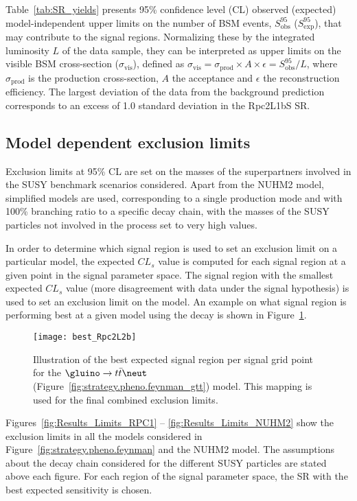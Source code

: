 Table~\ref{tab:SR_yields} presents 95\% confidence level (CL) observed (expected) model-independent upper limits 
on the number of BSM events, $S_{\textrm{obs}}^{95}$ ($S_{\textrm{exp}}^{95}$), that may contribute to the signal regions. 
Normalizing these by the integrated luminosity $L$ of the data sample, they can be interpreted as upper limits on the visible 
BSM cross-section ($\sigma_{\textrm{vis}}$), defined as $\sigma_{\textrm{vis}}=\sigma_{\textrm{prod}}\times A \times\epsilon=S_{\textrm{obs}}^{95}/L$, where 
$\sigma_{\textrm{prod}}$ is the production cross-section, $A$ the acceptance and $\epsilon$ the reconstruction efficiency. The largest 
deviation of the data from the background prediction corresponds to an excess of 1.0 standard deviation in the Rpc2L1bS SR.


\subsection{Model dependent exclusion limits}

Exclusion limits at 95\% CL are set on the masses of the superpartners involved in the SUSY benchmark scenarios considered. 
Apart from the NUHM2 model, simplified models are used, corresponding to a single production mode and with 100\% branching ratio to a specific decay chain, 
with the masses of the SUSY particles not involved in the process set to very high values. 

In order to determine which signal region is used to set an exclusion limit 
on a particular model, the expected $CL_s$ value is computed for each signal 
region at a given point in the signal parameter space. The signal 
region with the smallest expected  $CL_s$ value (more disagreement with data 
under the signal hypothesis) is used to set an exclusion limit on the model.
An example on what signal region is performing best at a given model using the 
decay is shown in Figure~\ref{fig:res.best_gtt}.

\begin{figure}[htb!]
\centering
\texttt{[image: best\_Rpc2L2b]}
\caption{Illustration of the best expected signal region per signal grid point for the 
$\gluino \to t\bar t\neut$ (Figure~\ref{fig:strategy.pheno.feynman_gtt}) model. 
This mapping is used for the final combined exclusion limits.}
\label{fig:res.best_gtt}
\end{figure}


Figures~\ref{fig:Results_Limits_RPC1} -- \ref{fig:Results_Limits_NUHM2} show the exclusion limits in all 
the models considered in Figure~\ref{fig:strategy.pheno.feynman} and the NUHM2 model. The assumptions about the decay chain considered for the different SUSY particles are 
stated above each figure. For each region of the signal parameter space, the SR with the best expected sensitivity is chosen.

